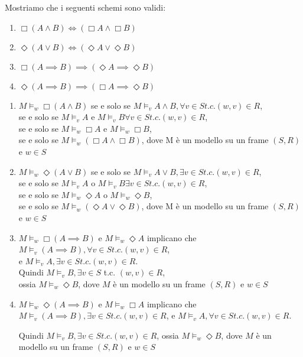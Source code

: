 \documentclass[../main.tex]{subfiles}
\begin{document}
Mostriamo che i seguenti schemi sono validi:
\begin{enumerate}
    \item $\Box (A \land B) \iff (\Box A \land \Box B)$
    \item $\Diamond (A \lor B) \iff (\Diamond A \lor \Diamond B)$
    \item $\Box (A \implies B) \implies (\Diamond A \implies \Diamond B)$
    \item $\Diamond (A \implies B) \implies (\Box A \implies \Diamond B)$
\end{enumerate}
\begin{enumerate}
    \item $M \vDash_w \Box (A \land B)$ se e solo se $M \vDash_v A \land B, \forall v \in S t.c. (w,v) \in R$,\\
          se e solo se $M \vDash_v A \text{ e } M \vDash_v B \forall v \in S t.c. (w,v) \in R$,\\
          se e solo se $M \vDash_w \Box A$ e $M \vDash_w \Box B$,\\
          se e solo se $M \vDash_w (\Box A \land \Box B)$, dove M è un modello su un frame $(S,R)$ e $w \in S$
    \item $M \vDash_w \Diamond (A \lor B)$ se e solo se $M \vDash_v A \lor B, \exists v \in S t.c. (w,v) \in R$,\\
          se e solo se $M \vDash_v A \text{ o } M \vDash_v B \exists v \in S t.c. (w,v) \in R$,\\
          se e solo se $M \vDash_w \Diamond A \text{ o } M \vDash_w \Diamond B$,\\
          se e solo se $M \vDash_w (\Diamond A \lor \Diamond B)$, dove M è un modello su un frame $(S,R)$ e $w \in S$
    \item $M \vDash_w \Box (A \implies B)$ e $M \vDash_w \Diamond A$ implicano che $M \vDash_v (A \implies B), \forall v \in S t.c. (w,v) \in R$,\\
          e $M \vDash_v A, \exists v \in S t.c. (w,v) \in R$.\\
          Quindi $M \vDash_v B, \exists  v \in S$ t.c. $(w,v) \in R$,\\
          ossia $M \vDash_w \Diamond B$, dove $M$ è un modello su un frame $(S,R)$ e $w \in S$
    \item $M \vDash_w \Diamond (A \implies B)$ e $M \vDash_w \Box A$ implicano che $M \vDash_v (A \implies B), \exists v \in S t.c. (w,v) \in R$, e $M \vDash_v A, \forall v \in S t.c. (w,v) \in R$.

          Quindi $M \vDash_v B, \exists v \in S t.c. (w,v) \in R$, ossia $M \vDash_w \Diamond B$, dove $M$ è un modello su un frame $(S,R)$ e $w \in S$
\end{enumerate}
\end{document}
